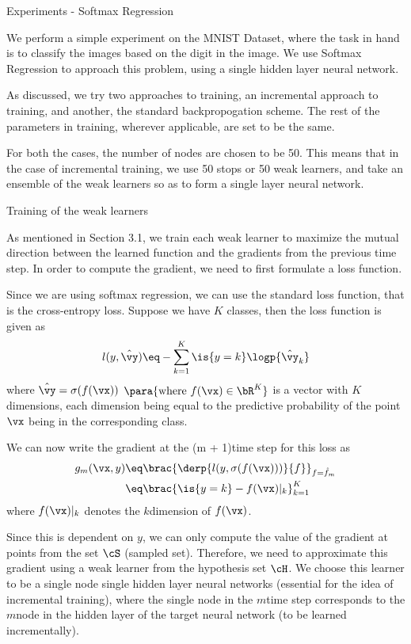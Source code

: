 \documentclass{article}
\begin{document}
\begin{psection}{Experiments - Softmax Regression}

	We perform a simple experiment on the MNIST Dataset, where the task in hand is to classify the images based on the digit in the image. We use Softmax Regression to approach this problem, using a single hidden layer neural network.

	As discussed, we try two approaches to training, an incremental approach to training, and another, the standard backpropogation scheme. The rest of the parameters in training, wherever applicable, are set to be the same.

	For both the cases, the number of nodes are chosen to be 50. This means that in the case of incremental training, we use 50 stops or 50 weak learners, and take an ensemble of the weak learners so as to form a single layer neural network.

	\begin{psubsection}{Training of the weak learners}

		As mentioned in Section 3.1, we train each weak learner to maximize the mutual direction between the learned function and the gradients from the previous time step. In order to compute the gradient, we need to first formulate a loss function.

		Since we are using softmax regression, we can use the standard loss function, that is the cross-entropy loss. Suppose we have $K$ classes, then the loss function is given as
		\begin{align*}
			l(y, \hat{\vy}) \eq - \sum_{k = 1}^K \is{y = k} \logp{\hat{\vy}_k}
		\end{align*}
		where $\hat{\vy} = \sigma(f(\vx))$ $\para{\text{where}\ f(\vx) \in \bR^K}$ is a vector with $K$ dimensions, each dimension being equal to the predictive probability of the point $\vx$ being in the corresponding class.

		We can now write the gradient at the (m + 1)\tth time step for this loss as
		\begin{align*}
			g_m(\vx, y) &\eq	\brac{\derp{l(y, \sigma(f(\vx)))}{f}}_{f = \hat{f}_m} \\
			&\eq				\brac{\is{y = k} - f(\vx)|_k}_{k = 1}^K
		\end{align*}
		where $f(\vx)|_k$ denotes the $k$\tth dimension of $f(\vx)$.

		Since this is dependent on $y$, we can only compute the value of the gradient at points from the set $\cS$ (sampled set). Therefore, we need to approximate this gradient using a weak learner from the hypothesis set $\cH$. We choose this learner to be a single node single hidden layer neural networks (essential for the idea of incremental training), where the single node in the $m$\tth time step corresponds to the $m$\tth node in the hidden layer of the target neural network (to be learned incrementally).


\end{psubsection}
\end{psection}
\end{document}
